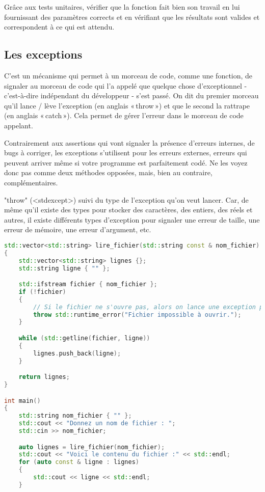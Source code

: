 \documentclass{article}
\begin{document}
\begin{itemize}
Grâce aux tests unitaires, vérifier que la fonction fait bien son travail en lui fournissant des paramètres corrects et en vérifiant que les résultats sont valides et correspondent à ce qui est attendu.

\subsection{Les exceptions}
C’est un mécanisme qui permet à un morceau de code, comme une fonction, de signaler au morceau de code qui l’a appelé que quelque chose d’exceptionnel - c’est-à-dire indépendant du développeur - s’est passé. On dit du premier morceau qu’il lance / lève l’exception (en anglais « throw ») et que le second la rattrape (en anglais « catch »). Cela permet de gérer l’erreur dans le morceau de code appelant.

Contrairement aux assertions qui vont signaler la présence d’erreurs internes, de bugs à corriger, les exceptions s’utilisent pour les erreurs externes, erreurs qui peuvent arriver même si votre programme est parfaitement codé. Ne les voyez donc pas comme deux méthodes opposées, mais, bien au contraire, complémentaires.

"throw" (<stdexcept>) suivi du type de l’exception qu’on veut lancer. Car, de même qu’il existe des types pour stocker des caractères, des entiers, des réels et autres, il existe différents types d’exception pour signaler une erreur de taille, une erreur de mémoire, une erreur d’argument, etc.


\begin{lstlisting}[language=C++]
std::vector<std::string> lire_fichier(std::string const & nom_fichier)
{
    std::vector<std::string> lignes {};
    std::string ligne { "" };

    std::ifstream fichier { nom_fichier };
    if (!fichier)
    {
        // Si le fichier ne s'ouvre pas, alors on lance une exception pour le signaler.
        throw std::runtime_error("Fichier impossible à ouvrir.");
    }

    while (std::getline(fichier, ligne))
    {
        lignes.push_back(ligne);
    }

    return lignes;
}

int main()
{
    std::string nom_fichier { "" };
    std::cout << "Donnez un nom de fichier : ";
    std::cin >> nom_fichier;

    auto lignes = lire_fichier(nom_fichier);
    std::cout << "Voici le contenu du fichier :" << std::endl;
    for (auto const & ligne : lignes)
    {
        std::cout << ligne << std::endl;
    }
\end{lstlisting}{}


\end{itemize}
\end{document}

